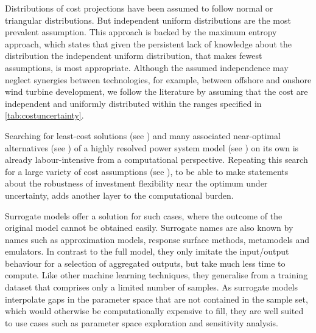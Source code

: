 Distributions of cost projections have been assumed to follow
normal\cite{mavromatidis_uncertainty_2018} or triangular\cite{li_using_2020}
distributions. But independent uniform distributions are the most prevalent
assumption.\cite{moret_characterization_2017,moret_robust_2016,shirizadeh_how_2019,trondle_trade-offs_2020,pilpola_analyzing_2020,Li2017,Trutnevyte2013,lopion_cost_2019}
This approach is backed by the maximum entropy approach,
\cite{trondle_trade-offs_2020} which states that given the persistent lack of
knowledge about the distribution the independent uniform distribution, that
makes fewest assumptions, is most appropriate. Although the assumed independence
may neglect synergies between technologies, for example, between offshore and
onshore wind turbine development, we follow the literature by assuming that the
cost are independent and uniformly distributed within the ranges specified in
\cref{tab:costuncertainty}.



Searching for least-cost solutions (see ) and many
associated near-optimal alternatives (see ) of a highly
resolved power system model (see ) on its own is already
labour-intensive from a computational perspective. Repeating this search for a
large variety of cost assumptions (see ), to be able to
make statements about the robustness of investment flexibility near the optimum
under uncertainty, adds another layer to the computational burden.


Surrogate models offer a solution for such cases, where the outcome of the
original model cannot be obtained easily. Surrogate names are also known by
names such as approximation models, response surface methods, metamodels and
emulators. In contrast to the full model, they only imitate the input/output
behaviour for a selection of aggregated outputs, but take much less time to
compute.\cite{palar_multi-fidelity_2016} Like other machine learning
techniques, they generalise from a training dataset that comprises only a
limited number of samples. As surrogate models interpolate gaps in the parameter
space that are not contained in the sample set, which would otherwise be
computationally expensive to fill, they are well suited to use cases such as
parameter space exploration and sensitivity analysis.

